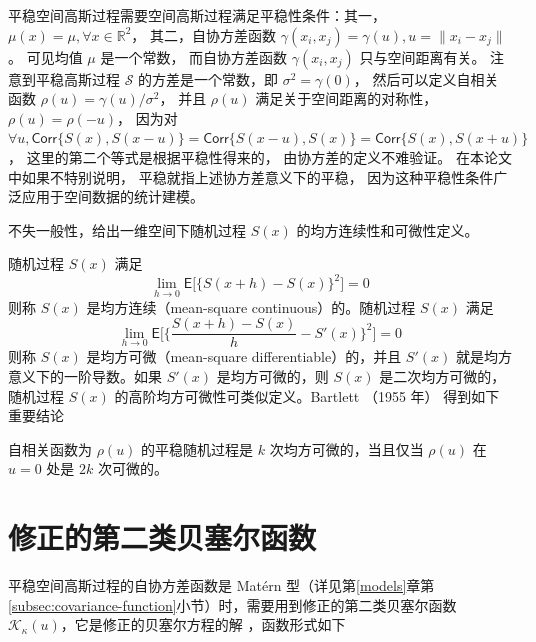 \documentclass[12pt,a4paper,UTF8,twoside]{book}
\theoremstyle{definition}
\theoremstyle{definition}
\theoremstyle{definition}
\theoremstyle{remark}
\let\BeginKnitrBlock\begin \let\EndKnitrBlock\end
\begin{document}
平稳空间高斯过程需要空间高斯过程满足平稳性条件：其一，
\(\mu(x) = \mu, \forall x \in \mathbb{R}^2\)， 其二，自协方差函数
\(\gamma(x_i,x_j) = \gamma(u),u=\|x_{i} - x_{j}\|\)。 可见均值 \(\mu\)
是一个常数， 而自协方差函数 \(\gamma(x_i,x_j)\) 只与空间距离有关。
注意到平稳高斯过程 \(\mathcal{S}\) 的方差是一个常数，即
\(\sigma^2 = \gamma(0)\)， 然后可以定义自相关函数
\(\rho(u) = \gamma(u)/\sigma^2\)， 并且 \(\rho(u)\)
满足关于空间距离的对称性， \(\rho(u) = \rho(-u)\)， 因为对
\(\forall u, \mathsf{Corr}\{S(x),S(x-u)\} = \mathsf{Corr}\{S(x-u), S(x)\} = \mathsf{Corr}\{S(x),S(x+u)\}\)，
这里的第二个等式是根据平稳性得来的， 由协方差的定义不难验证。
在本论文中如果不特别说明， 平稳就指上述协方差意义下的平稳，
因为这种平稳性条件广泛应用于空间数据的统计建模。

不失一般性，给出一维空间下随机过程 \(S(x)\) 的均方连续性和可微性定义。

\BeginKnitrBlock{definition}[连续性和可微性]
\protect\hypertarget{def:continuous-differentiable}{}{\label{def:continuous-differentiable}
{} }随机过程 \(S(x)\) 满足
\[ \lim_{h \to 0} \mathsf{E}\big[ \{S(x + h) - S(x)\}^{2} \big] = 0 \]
\noindent 则称 \(S(x)\) 是均方连续（mean-square continuous）的。随机过程
\(S(x)\) 满足
\[ \lim_{h \to 0} \mathsf{E} \big[ \{ \frac{S(x+h) - S(x)}{h} - S'(x) \}^2 \big] = 0 \]
\noindent 则称 \(S(x)\) 是均方可微（mean-square differentiable）的，并且
\(S'(x)\) 就是均方意义下的一阶导数。如果 \(S'(x)\) 是均方可微的，则
\(S(x)\) 是二次均方可微的，随机过程 \(S(x)\)
的高阶均方可微性可类似定义\citep{Diggle2007}。Bartlett （1955 年）
\citep{Bartlett1955} 得到如下重要结论
\EndKnitrBlock{definition}

\BeginKnitrBlock{theorem}[平稳随机过程的可微性]
\protect\hypertarget{thm:stationary-mean-square-properties}{}{\label{thm:stationary-mean-square-properties}
{} }自相关函数为 \(\rho(u)\)
的平稳随机过程是 \(k\) 次均方可微的，当且仅当 \(\rho(u)\) 在 \(u = 0\)
处是 \(2k\) 次可微的。
\EndKnitrBlock{theorem}

\hypertarget{sec:modified-bessel-function}{%
\section{修正的第二类贝塞尔函数}\label{sec:modified-bessel-function}}

平稳空间高斯过程的自协方差函数是 Matérn
型（详见第\ref{models}章第\ref{subsec:covariance-function}小节）时，需要用到修正的第二类贝塞尔函数
\(\mathcal{K}_{\kappa}(u)\)，它是修正的贝塞尔方程的解
\citep{Abramowitz1972}，函数形式如下
\end{document}
